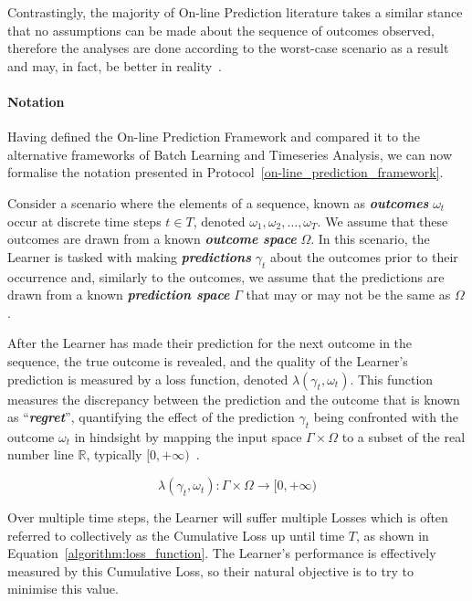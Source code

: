 Contrastingly, the majority of On-line Prediction literature takes a similar stance that no assumptions can be made about the sequence of outcomes observed, therefore the analyses are done according to the worst-case scenario as a result and may, in fact, be better in reality~\cite{cesa-bianchi:1997}.

\paragraph{Notation}\label{paragraph:notation}
Having defined the On-line Prediction Framework and compared it to the alternative frameworks of Batch Learning and Timeseries Analysis, we can now formalise the notation presented in Protocol~\ref{on-line_prediction_framework}.

Consider a scenario where the elements of a sequence, known as \textbf{\textit{outcomes}} $\omega_t$ occur at discrete time steps $t \in T$, denoted $\omega_1, \omega_2, \ldots, \omega_T$. We assume that these outcomes are drawn from a known \textbf{\textit{outcome space}} $\Omega$.  In this scenario, the Learner is tasked with making \textbf{\textit{predictions}} $\gamma_t$ about the outcomes prior to their occurrence and, similarly to the outcomes, we assume that the predictions are drawn from a known \textbf{\textit{prediction space}} $\Gamma$ that may or may not be the same as $\Omega$.

After the Learner has made their prediction for the next outcome in the sequence, the true outcome is revealed, and the quality of the Learner's prediction is measured by a loss function, denoted $\lambda(\gamma_t, \omega_t)$. This function measures the discrepancy between the prediction and the outcome that is known as ``\textbf{\textit{regret}}'', quantifying the effect of the prediction $\gamma_t$ being confronted with the outcome $\omega_t$ in hindsight by mapping the input space $\Gamma \times \Omega$ to a subset of the real number line $\mathbb{R}$, typically $[0, +\infty)$~\cite{kalnishkan:2009}.

\begin{equation}
    \lambda(\gamma_t, \omega_t): \Gamma \times \Omega \rightarrow [0, +\infty)
\end{equation}

Over multiple time steps, the Learner will suffer multiple Losses which is often referred to collectively as the Cumulative Loss up until time $T$, as shown in Equation~\ref{algorithm:loss_function}. The Learner's performance is effectively measured by this Cumulative Loss, so their natural objective is to try to minimise this value.

